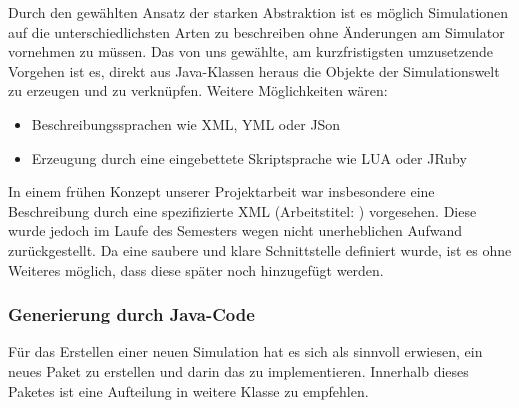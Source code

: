 Durch den gewählten Ansatz der starken Abstraktion ist es möglich Simulationen auf die unterschiedlichsten Arten zu beschreiben ohne Änderungen am Simulator vornehmen zu müssen. Das von uns gewählte, am kurzfristigsten umzusetzende Vorgehen ist es, direkt aus Java-Klassen heraus die Objekte der Simulationswelt zu erzeugen und zu verknüpfen. Weitere Möglichkeiten wären:
\begin{itemize}
  \item{Beschreibungssprachen wie XML, YML oder JSon}
  \item{Erzeugung durch eine eingebettete Skriptsprache wie LUA oder JRuby}
\end{itemize}
In einem frühen Konzept unserer Projektarbeit war insbesondere eine Beschreibung durch eine spezifizierte XML (Arbeitstitel: ) vorgesehen. Diese wurde jedoch im Laufe des Semesters wegen nicht unerheblichen Aufwand zurückgestellt. Da eine saubere und klare Schnittstelle definiert wurde, ist es ohne Weiteres möglich, dass diese später noch hinzugefügt werden.

\subsubsection{Generierung durch Java-Code}\label{subsec:real_generator_java}
Für das Erstellen einer neuen Simulation hat es sich als sinnvoll erwiesen, ein neues Paket zu erstellen und darin das  zu implementieren. Innerhalb dieses Paketes ist eine Aufteilung in weitere Klasse zu empfehlen.

